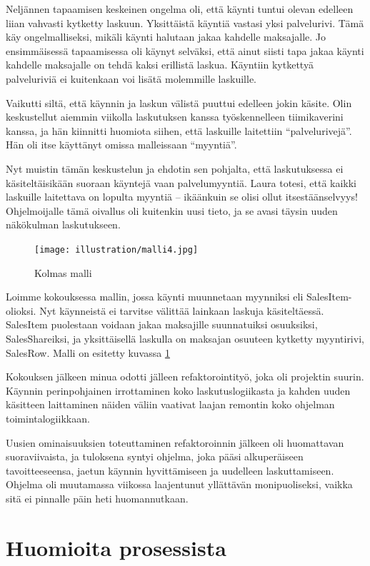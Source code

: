 Neljännen tapaamisen keskeinen ongelma oli, että käynti tuntui olevan
edelleen liian vahvasti kytketty laskuun. Yksittäistä käyntiä vastasi
yksi palvelurivi. Tämä käy ongelmalliseksi, mikäli käynti halutaan jakaa
kahdelle maksajalle. Jo ensimmäisessä tapaamisessa oli käynyt selväksi,
että ainut siisti tapa jakaa käynti kahdelle maksajalle on tehdä kaksi
erillistä laskua. Käyntiin kytkettyä palveluriviä ei kuitenkaan voi
lisätä molemmille laskuille.

Vaikutti siltä, että käynnin ja laskun välistä puuttui edelleen jokin
käsite. Olin keskustellut aiemmin viikolla laskutuksen kanssa
työskennelleen tiimikaverini kanssa, ja hän kiinnitti huomiota siihen,
että laskuille laitettiin ``palvelurivejä''. Hän oli itse käyttänyt
omissa malleissaan ``myyntiä''.

Nyt muistin tämän keskustelun ja ehdotin sen pohjalta, että
laskutuksessa ei käsiteltäisikään suoraan käyntejä vaan palvelumyyntiä.
Laura totesi, että kaikki laskuille laitettava on lopulta myyntiä --
ikäänkuin se olisi ollut itsestäänselvyys! Ohjelmoijalle tämä oivallus
oli kuitenkin uusi tieto, ja se avasi täysin uuden näkökulman
laskutukseen.

\begin{figure}
\centering
\texttt{[image: illustration/malli4.jpg]}
\caption{\label{malli3}Kolmas malli}
\end{figure}

Loimme kokouksessa mallin, jossa käynti muunnetaan myynniksi eli
SalesItem-olioksi. Nyt käynneistä ei tarvitse välittää lainkaan laskuja
käsiteltäessä. SalesItem puolestaan voidaan jakaa maksajille
suunnatuiksi osuuksiksi, SalesShareiksi, ja yksittäisellä laskulla on
maksajan osuuteen kytketty myyntirivi, SalesRow. Malli on esitetty
kuvassa \ref{malli3}

Kokouksen jälkeen minua odotti jälleen refaktorointityö, joka oli
projektin suurin. Käynnin perinpohjainen irrottaminen koko
laskutuslogiikasta ja kahden uuden käsitteen laittaminen näiden väliin
vaativat laajan remontin koko ohjelman toimintalogiikkaan.

Uusien ominaisuuksien toteuttaminen refaktoroinnin jälkeen oli
huomattavan suoraviivaista, ja tuloksena syntyi ohjelma, joka pääsi
alkuperäiseen tavoitteeseensa, jaetun käynnin hyvittämiseen ja uudelleen
laskuttamiseen. Ohjelma oli muutamassa viikossa laajentunut yllättävän
monipuoliseksi, vaikka sitä ei pinnalle päin heti huomannutkaan.

\hypertarget{huomioita-prosessista}{%
\section{Huomioita prosessista}\label{huomioita-prosessista}}

